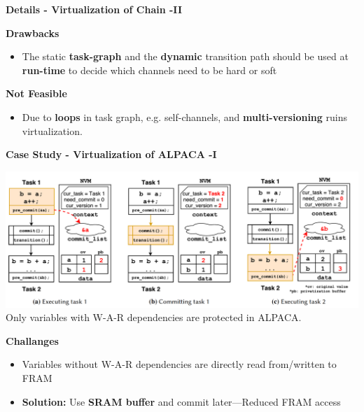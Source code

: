 \begin{frame}{\textbf{Details - Virtualization of Chain -II}}
	\begin{block}{\textbf{Drawbacks}}
		\begin{itemize}
			\item The static \textbf{task-graph} and the \textbf{dynamic} transition path should be used at \textbf{run-time} to decide which channels need to be hard or soft
		\end{itemize}	
	\end{block}

	\begin{alertblock}{\textbf{Not Feasible}}
	\begin{itemize}
		\item Due to \textbf{loops} in task graph, e.g. self-channels, and \textbf{multi-versioning} ruins virtualization.
	\end{itemize}	
\end{alertblock}
	
\end{frame}


\begin{frame}{\textbf{Case Study - Virtualization of ALPACA -I}}
	
		\centering
		\includegraphics[scale=0.3]{images/alpaca-privatization.png} \\
Only variables with W-A-R dependencies are protected in ALPACA.
		

	
	\begin{block}{\textbf{Challanges}}
		\begin{itemize}
			\item Variables without W-A-R dependencies are directly read from/written to FRAM 
			\item \textbf{Solution:} Use \textbf{SRAM buffer} and commit later---Reduced FRAM access
		\end{itemize}	
	\end{block}
	
\end{frame}

